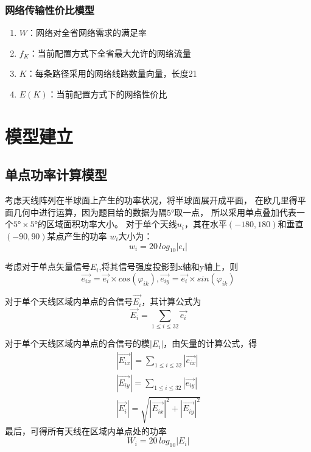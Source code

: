 \documentclass[UTF8,12pt]{ctexart}
\begin{document}
      \subsubsection{网络传输性价比模型}
        \begin{enumerate}
            \item $W$：网络对全省网络需求的满足率
            \item $f_K$：当前配置方式下全省最大允许的网络流量
            \item $K$：每条路径采用的网络线路数量向量，长度21
            \item $E(K)$：当前配置方式下的网络性价比
        \end{enumerate}





\section{模型建立}
    \subsection{单点功率计算模型}
    考虑天线阵列在半球面上产生的功率状况，将半球面展开成平面，
    在欧几里得平面几何中进行运算，因为题目给的数据为隔$5°$取一点，
    所以采用单点叠加代表一个$5°×5°$的区域面积功率大小。
    对于单个天线$u_i$，其在水平$(-180,180)$和垂直$(-90,90)$某点产生的功率
    $w_i$大小为：$$w_i = 20\, log_{10}{|e_i|}$$
    
    \noindent 考虑对于单点矢量信号$E_i$,将其信号强度投影到x轴和y轴上，则
    $$\vec{e_{ix}} = \vec{e_{i}}×cos(\varphi_{ik}), 
    \vec{e_{iy}} = \vec{e_{i}}×sin(\varphi_{ik})$$
    
    \noindent 对于单个天线区域内单点的合信号$\vec{E_{i}}$，其计算公式为
    $$\vec{E_{i}}=\sum_{1\leqslant i \leqslant 32} \vec{e_{i}}$$
    
    \noindent 对于单个天线区域内单点的合信号的模$|E_i|$，由矢量的计算公式，得
    \begin{gather*}
        |\vec {E_{ix}}| = \sum_{1\le i \le 32} |\vec {e_{ix}}|\\
        |\vec {E_{iy}}| = \sum_{1\le i \le 32} |\vec {e_{iy}}|\\
        |\vec {E_i}| = \sqrt{|\vec {E_{ix}}|^{2}+|\vec {E_{iy}}|^{2}}
    \end{gather*}
    最后，可得所有天线在区域内单点处的功率
    $$W_i = 20\, log_{10}{|E_i|}$$
\end{document}
